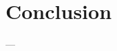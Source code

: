 %
%
%
%
%
%
%
%
%

%
%

\section{Conclusion}\label{sec:methodology-conclusion}

---

\cleardoublepage
